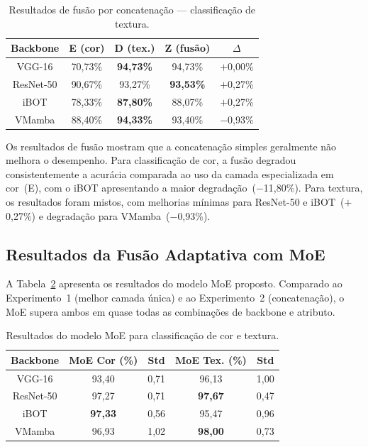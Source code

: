 \documentclass[letterpaper, 10 pt, conference]{ieeeconf}
\begin{document}
\begin{table}[htbp]
\caption{Resultados de fusão por concatenação — classificação de textura.}
\begin{center}
\begin{tabular}{c|c|c|c|c}
\hline
\textbf{Backbone} & \textbf{E (cor)} & \textbf{D (tex.)}
                  & \textbf{Z (fusão)} & \textbf{$\Delta$} \\
\hline
VGG-16    & 70,73\% & \textbf{94,73\%} & 94,73\% & $+$0,00\% \\
ResNet-50 & 90,67\% & 93,27\%          & \textbf{93,53\%} & $+$0,27\% \\
iBOT      & 78,33\% & \textbf{87,80\%} & 88,07\% & $+$0,27\% \\
VMamba    & 88,40\% & \textbf{94,33\%} & 93,40\% & $-$0,93\% \\
\hline
\end{tabular}
\label{tab7}
\end{center}
\end{table}

Os resultados de fusão mostram que a concatenação simples geralmente não
melhora o desempenho.
Para classificação de cor, a fusão degradou consistentemente a acurácia
comparada ao uso da camada especializada em cor~(E), com o iBOT
apresentando a maior degradação~($-$11,80\%).
Para textura, os resultados foram mistos, com melhorias mínimas para
ResNet-50 e iBOT~($+$0,27\%) e degradação para VMamba~($-$0,93\%).

\subsection{Resultados da Fusão Adaptativa com MoE}

A Tabela~\ref{tab_moe} apresenta os resultados do modelo MoE proposto.
Comparado ao Experimento~1 (melhor camada única) e ao Experimento~2
(concatenação), o MoE supera ambos em quase todas as combinações de
backbone e atributo.

\begin{table}[htbp]
\caption{Resultados do modelo MoE para classificação de cor e textura.}
\begin{center}
\begin{tabular}{c|c|c|c|c}
\hline
\textbf{Backbone} & \textbf{MoE Cor (\%)} & \textbf{Std}
                  & \textbf{MoE Tex. (\%)} & \textbf{Std} \\
\hline
VGG-16    & 93,40 & 0,71 & 96,13 & 1,00 \\
ResNet-50 & 97,27 & 0,71 & \textbf{97,67} & 0,47 \\
iBOT      & \textbf{97,33} & 0,56 & 95,47 & 0,96 \\
VMamba    & 96,93 & 1,02 & \textbf{98,00} & 0,73 \\
\hline
\end{tabular}
\label{tab_moe}
\end{center}
\end{table}
\end{document}
